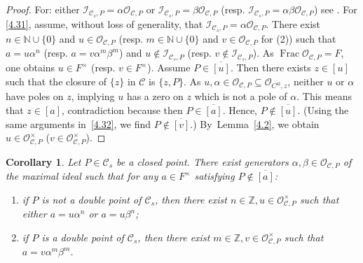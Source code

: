 \documentclass[JEP,XML,SOM,Unicode,NoFloatCountersInSection,published]{cedram}
\newcommand{\al}{\mathrm{al}}
\DeclareMathOperator{\Frac}{Frac}
\newtheorem{cor}[thm]{Corollary}
\theoremstyle{definition}
\begin{document}
\begin{proof}
For: either $\mathcal{I}_{\mathcal{C}_s,P}=\alpha \mathcal{O}_{\mathcal{C}, P}$ or $\mathcal{I}_{\mathcal{C}_s,P}=\beta \mathcal{O}_{\mathcal{C}, P}$ (resp. $\mathcal{I}_{\mathcal{C}_s,P}=\alpha \beta\mathcal{O}_{\mathcal{C}, P}$) see \cite[Tag~0BI9]{stacks}. For \eqref{4.31}, assume, without loss of generality, that $\mathcal{I}_{\mathcal{C}_s,P}=\alpha \mathcal{O}_{\mathcal{C}, P}$.
There exist $n \in \mathbb{N} \cup \{0\}$ and $u \in \mathcal{O}_{\mathcal{C}, P}$ (resp. $m \in \mathbb{N} \cup \{0\}$ and $v \in \mathcal{O}_{\mathcal{C}, P}$ for (2)) such that $a=u\alpha^n$ (resp. $a=v\alpha^m \beta^m$) and $u \not \in \mathcal{I}_{\mathcal{C}_s,P}$ (resp. $v \not \in \mathcal{I}_{\mathcal{C}_s,P}$). As $\Frac \mathcal{O}_{\mathcal{C}, P}=F$, one obtains $u \in F^{\times}$ (resp. $v \in F^{\times}$). Assume $P \in \overline{[u]}$. Then there exists $z \in [u]$ such that the closure of $\{z\}$ in $\mathcal{C}$ is $\{z,P\}$. As $u, \alpha \in \mathcal{O}_{\mathcal{C}, P} \subseteq \mathcal{O}_{C^{\al},z}$, neither $u$ or $\alpha$ have poles on $z$, implying $u$ has a zero on $z$ which is not a pole of $\alpha$. This means that $z \in [a]$, contradiction because then $P \in \overline{[a]}$. Hence, $P \not \in \overline{[u]}$. (Using the same arguments in~\eqref{4.32}, we find $P \not \in \overline{[v]}$.) By~Lemma~\ref{4.2}, we obtain $u \in \mathcal{O}_{\mathcal{C},P}^{\times}$ (\resp ${v \in \mathcal{O}_{\mathcal{C}, P}^{\times}}$).
\end{proof}

\begin{cor} \label{4.4}
Let $P \in \mathcal{C}_s$ be a closed point. There exist generators $\alpha, \beta \in \mathcal{O}_{\mathcal{C}, P}$ of the maximal ideal such that for any $a \in F^{\times}$ satisfying $P \not \in \overline{[a]}$:
\begin{enumerate}
\item if $P$ is not a double point of $\mathcal{C}_s$, then there exist $n \in \mathbb{Z}, u \in \mathcal{O}_{\mathcal{C}, P}^{\times}$ such that either $a=u\alpha^n$ or $a=u \beta^n$;
\item if $P$ is a double point of $\mathcal{C}_s$, then there exist $m \in \mathbb{Z}, v \in \mathcal{O}_{\mathcal{C},P}^{\times}$ such that $a=v \alpha^m \beta^m$.
\end{enumerate}
\end{cor}
\end{document}
